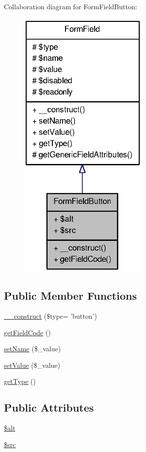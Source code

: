Collaboration diagram for FormFieldButton:\nopagebreak
\begin{figure}[H]
\begin{center}
\leavevmode
\includegraphics[width=184pt]{classFormFieldButton__coll__graph}
\end{center}
\end{figure}
\subsection*{Public Member Functions}
\begin{DoxyCompactItemize}
\item 
\hyperlink{classFormFieldButton_aa531597334029bd24bcaf4236d540d69}{\_\-\_\-construct} (\$type= 'button')
\item 
\hyperlink{classFormFieldButton_a792223807cd33f982ec6a5869120baab}{getFieldCode} ()
\item 
\hyperlink{classFormField_ad57e32bd53170af060e869b3b60f0ef7}{setName} (\$\_\-value)
\item 
\hyperlink{classFormField_a465ff61e290d82be96bb793c3a14b3e7}{setValue} (\$\_\-value)
\item 
\hyperlink{classFormField_a1f64b737bccb6b2827f8c5665b9920c7}{getType} ()
\end{DoxyCompactItemize}
\subsection*{Public Attributes}
\begin{DoxyCompactItemize}
\item 
\hyperlink{classFormFieldButton_afd8b16194bd066a1beaa02c450bbe4e5}{\$alt}
\item 
\hyperlink{classFormFieldButton_a9cc3c232dc78605cdff84f4784298d08}{\$src}
\end{DoxyCompactItemize}
